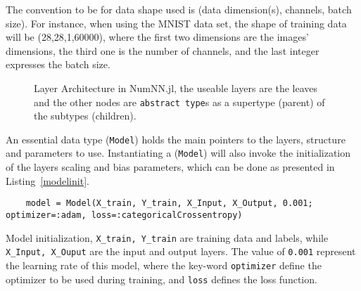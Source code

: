 The convention to be for data shape used is (data dimension(s), channels, batch size). For instance, when using the MNIST \cite{LeCun1998,LeCun1998a} data set, the shape of training data will be (28,28,1,60000), where the first two dimensions are the images' dimensions, the third one is the number of channels, and the last integer expresses the batch size.

\begin{figure}[!htbp]
	\centering
		
	\caption{Layer Architecture in NumNN.jl, the useable layers are the leaves and the other nodes are \texttt{abstract type}s as a supertype (parent) of the subtypes (children).}\label{fig:layerstruct}
\end{figure}

An essential data type (\texttt{Model}) holds the main pointers to the layers, structure and parameters to use. Instantiating a (\texttt{Model}) will also invoke the initialization of the layers scaling and bias parameters, which can be done as presented in Listing~\ref{modelinit}.

\begin{listing}[H]
	\begin{verbatim}
	model = Model(X_train, Y_train, X_Input, X_Output, 0.001; optimizer=:adam, loss=:categoricalCrossentropy)
	\end{verbatim}
	\caption{Model initialization, \texttt{X_train, Y_train} are training data and labels, while \texttt{X_Input, X_Ouput} are the input and output layers. The value of \texttt{0.001} represent the learning rate of this model, where the key-word \texttt{optimizer} define the optimizer to be used during training, and \texttt{loss} defines the loss function.}\label{modelinit}
\end{listing}

